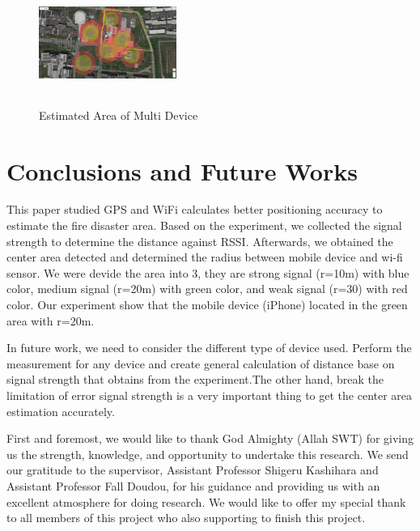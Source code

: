 \documentclass[twocolumn,10pt]{asme2ej}
\begin{document}
	\begin{figure}[t]
		\begin{center}
			\setlength{\unitlength}{0.012500in}%
			\includegraphics[width=0.4\textwidth,height=40mm]{Fig7_AreaDetected_MultiDevice.png}
		\end{center}
		\caption{Estimated Area of Multi Device}
		\label{Experiment Route} 
	\end{figure}
	
	\section{Conclusions and Future Works}
	This paper studied GPS and WiFi calculates better positioning accuracy to estimate the fire disaster area. Based on the experiment, we collected the signal strength to determine the distance against RSSI. Afterwards, we obtained the center area detected and determined the radius between mobile device and wi-fi sensor. We were devide the area into 3, they are strong signal (r=10m) with blue color, medium signal (r=20m) with green color, and weak signal (r=30) with red color. Our experiment show that the mobile device (iPhone) located in the green area with r=20m.
	
	In future work, we need to consider the different type of device used. Perform the measurement for any device and create general calculation of distance base on signal strength that obtains from the experiment.The other hand, break the limitation of error signal strength is a very important thing to get the center area estimation accurately. 

	\begin{acknowledgment}
		
	First and foremost, we would like to thank God Almighty (Allah SWT) for giving us the strength, knowledge, and opportunity to undertake this research. We send our gratitude to the supervisor, Assistant Professor Shigeru Kashihara and Assistant Professor Fall Doudou, for his guidance and providing us with an excellent atmosphere for doing research. We would like to offer my special thank to all members of this project who also supporting to finish this project.
		
	\end{acknowledgment}
	
\end{document}

